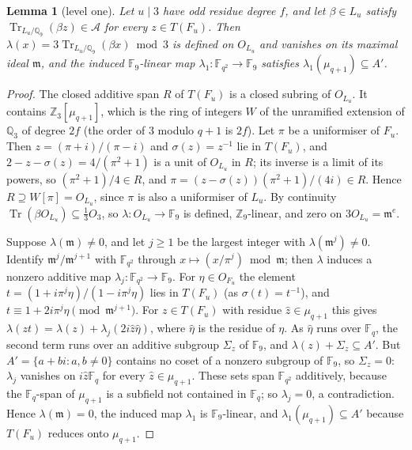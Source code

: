 \documentclass[11pt,a4paper]{amsart}
\newtheorem{lemma}{Lemma}
\theoremstyle{remark}
\newcommand{\Q}{\mathbb{Q}}
\newcommand{\Z}{\mathbb{Z}}
\newcommand{\F}{\mathbb{F}}
\newcommand{\Tr}{\operatorname{Tr}}
\newcommand{\cA}{\mathcal{A}}
\begin{document}
\begin{lemma}[level one]\label{lem:B4}
Let $u\mid3$ have odd residue degree $f$, and let $\beta\in L_u$ satisfy $\Tr_{L_u/\Q_9}(\beta z)\in\cA$ for every
$z\in T(F_u)$. Then $\lambda(x)=3\Tr_{L_u/\Q_9}(\beta x)\bmod3$ is defined on $O_{L_u}$ and vanishes on its maximal
ideal $\mathfrak m$, and the induced $\F_9$-linear map $\lambda_1:\F_{q^2}\to\F_9$ satisfies
$\lambda_1(\mu_{q+1})\subseteq A'$.
\end{lemma}

\begin{proof}
The closed additive span $R$ of $T(F_u)$ is a closed subring of $O_{L_u}$. It contains $\Z_3[\mu_{q+1}]$, which is
the ring of integers $W$ of the unramified extension of $\Q_3$ of degree $2f$ (the order of $3$ modulo $q+1$ is
$2f$). Let $\pi$ be a uniformiser of $F_u$. Then $z=(\pi+i)/(\pi-i)$ and $\sigma(z)=z^{-1}$ lie in $T(F_u)$, and
$2-z-\sigma(z)=4/(\pi^2+1)$ is a unit of $O_{L_u}$ in $R$; its inverse is a limit of its powers, so
$(\pi^2+1)/4\in R$, and $\pi=(z-\sigma(z))(\pi^2+1)/(4i)\in R$. Hence $R\supseteq W[\pi]=O_{L_u}$, since $\pi$ is
also a uniformiser of $L_u$. By continuity $\Tr(\beta O_{L_u})\subseteq\frac13O_3$, so $\lambda:O_{L_u}\to\F_9$ is
defined, $\Z_9$-linear, and zero on $3O_{L_u}=\mathfrak m^e$.

Suppose $\lambda(\mathfrak m)\ne0$, and let $j\ge1$ be the largest integer with $\lambda(\mathfrak m^j)\ne0$.
Identify $\mathfrak m^j/\mathfrak m^{j+1}$ with $\F_{q^2}$ through $x\mapsto(x/\pi^j)\bmod\mathfrak m$; then
$\lambda$ induces a nonzero additive map $\lambda_j:\F_{q^2}\to\F_9$. For $\eta\in O_{F_u}$ the element
$t=(1+i\pi^j\eta)/(1-i\pi^j\eta)$ lies in $T(F_u)$ (as $\sigma(t)=t^{-1}$), and $t\equiv1+2i\pi^j\eta\pmod{\mathfrak
m^{j+1}}$. For $z\in T(F_u)$ with residue $\hat z\in\mu_{q+1}$ this gives $\lambda(zt)=\lambda(z)+\lambda_j(2i\hat z\hat\eta)$, where
$\hat\eta$ is the residue of $\eta$. As $\hat\eta$ runs over $\F_q$, the second term runs over an additive subgroup
$\Sigma_z$ of $\F_9$, and $\lambda(z)+\Sigma_z\subseteq A'$. But $A'=\{a+bi:a,b\ne0\}$ contains no coset of a
nonzero subgroup of $\F_9$, so $\Sigma_z=0$: $\lambda_j$ vanishes on $i\hat z\F_q$ for every $\hat z\in\mu_{q+1}$.
These sets span $\F_{q^2}$ additively, because the $\F_q$-span of $\mu_{q+1}$ is a subfield not contained in
$\F_q$; so $\lambda_j=0$, a contradiction. Hence $\lambda(\mathfrak m)=0$, the induced map $\lambda_1$ is
$\F_9$-linear, and $\lambda_1(\mu_{q+1})\subseteq A'$ because $T(F_u)$ reduces onto $\mu_{q+1}$.
\end{proof}
\end{document}
